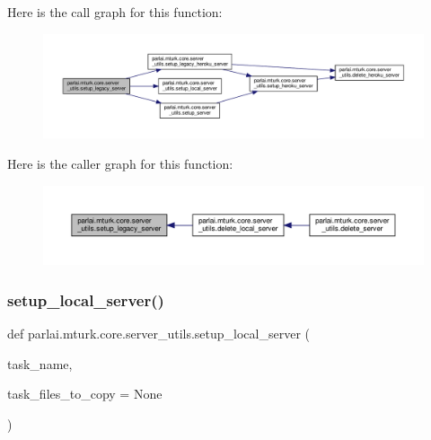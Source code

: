 Here is the call graph for this function\+:
\nopagebreak
\begin{figure}[H]
\begin{center}
\leavevmode
\includegraphics[width=350pt]{namespaceparlai_1_1mturk_1_1core_1_1server__utils_afe9361009645f245de2a07c18cd485bb_cgraph}
\end{center}
\end{figure}
Here is the caller graph for this function\+:
\nopagebreak
\begin{figure}[H]
\begin{center}
\leavevmode
\includegraphics[width=350pt]{namespaceparlai_1_1mturk_1_1core_1_1server__utils_afe9361009645f245de2a07c18cd485bb_icgraph}
\end{center}
\end{figure}
\mbox{\label{namespaceparlai_1_1mturk_1_1core_1_1server__utils_a9d4c4937ea60bd74630a44739e825ebf}} 
\subsubsection{\texorpdfstring{setup\+\_\+local\+\_\+server()}{setup\_local\_server()}}
{\footnotesize\ttfamily def parlai.\+mturk.\+core.\+server\+\_\+utils.\+setup\+\_\+local\+\_\+server (\begin{DoxyParamCaption}\item[{}]{task\+\_\+name,  }\item[{}]{task\+\_\+files\+\_\+to\+\_\+copy = {\ttfamily None} }\end{DoxyParamCaption})}




